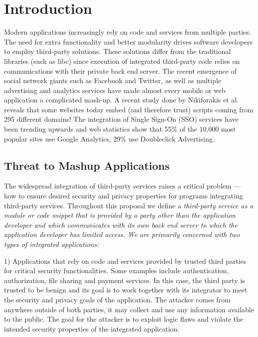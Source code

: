 \chapter{Introduction}
\label{ch:intro}

Modern applications increasingly rely on code and services from multiple parties.  The need for extra functionality and better modularity drives software developers to employ third-party solutions.  These solutions differ from the traditional libraries (such as libc) since execution of integrated third-party code relies on communications with their private back end server.  The recent emergence of social network giants such as Facebook and Twitter, as well as multiple advertising and analytics services have made almost every mobile or web application a complicated mash-up.  A recent study done by Nikiforakis et al.~\cite{Nikiforakis:2012:YYI:2382196.2382274} reveals that some websites today embed (and therefore trust) scripts coming from 295 different domains!  The integration of Single Sign-On (SSO) services have been trending upwards and web statistics show that 55\% of the 10,000 most popular sites use Google Analytics, 29\% use Doubleclick Advertising.

\section{Threat to Mashup Applications}

The widespread integration of third-party services raises a critical problem --- how to ensure desired security and privacy properties for programs integrating third-party services.  Throughout this proposal we define a \em third-party service \em as a module or code snippet that is provided by a party other than the application developer and which communicates with its own back end server to which the application developer has limited access.  We are primarily concerned with two types of integrated applications:  

1) Applications that rely on code and services provided by trusted third parties for critical security functionalities.  Some examples include authentication, authorization, file sharing and payment services.  In this case, the third party is trusted to be benign and its goal is to work together with its integrator to meet the security and privacy goals of the application.  The attacker comes from anywhere outside of both parties, it may collect and use any information available to the public.  The goal for the attacker is to exploit logic flaws and violate the intended security properties of the integrated application.  

